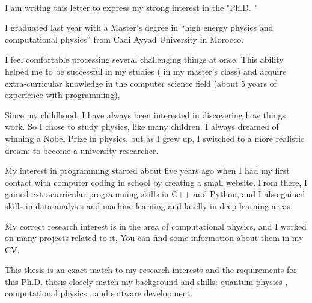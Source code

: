 \documentclass[11pt, a4paper]{awesome-cv}
\begin{document}
	
	\makecvheader[C]
	
	
 	\makelettertitle
	
	
	
	
	\begin{cvletter}
\dearauthor \\
I am writing this letter to express my strong interest in the "Ph.D. \thesis"
		
		
%		
% 
% 
% 

I graduated last year with a Master’s degree in “high energy physics and computational physics” from Cadi Ayyad University in Morocco.

I feel comfortable processing several challenging things at once. This ability helped me to be successful in my studies (    in my master's class) and acquire extra‐curricular knowledge in the computer science field (about 5 years of experience with programming),


Since my childhood, I have always been interested in discovering how things work. So I chose to study physics, like many children. I always dreamed of winning a Nobel Prize in physics, but as I grew up, I switched to a more realistic dream: to become a university researcher.

My interest in programming started about five years ago when I had my first contact with computer coding in school by creating a small website. From there, I gained extracurricular programming skills in C++ and Python, and I also gained skills in data analysis and machine learning and latelly in deep learning areas.

My correct research interest is in the area of computational physics, and I worked on many projects related to it, You can find some information about them in my CV.

This thesis is an exact match to my research interests and the requirements for this Ph.D. thesis closely match my background and skills: quantum physics , computational physics , and software development.


\end{cvletter}
\end{document}
